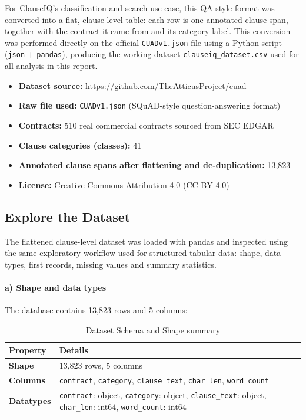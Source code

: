 \documentclass[12pt, a4paper]{report}
\begin{document}
For ClauseIQ's classification and search use case, this QA-style format was converted into a flat, clause-level table: each row is one annotated clause span, together with the contract it came from and its category label. This conversion was performed directly on the official \texttt{CUADv1.json} file using a Python script (\texttt{json} + \texttt{pandas}), producing the working dataset \texttt{clauseiq\_dataset.csv} used for all analysis in this report.
\begin{itemize}
    \item \textbf{Dataset source:} \url{https://github.com/TheAtticusProject/cuad}
    \item \textbf{Raw file used:} \texttt{CUADv1.json} (SQuAD-style question-answering format)
    \item \textbf{Contracts:} 510 real commercial contracts sourced from SEC EDGAR
    \item \textbf{Clause categories (classes):} 41
    \item \textbf{Annotated clause spans after flattening and de-duplication:} 13,823
    \item \textbf{License:} Creative Commons Attribution 4.0 (CC BY 4.0)
\end{itemize}

\subsection{Explore the Dataset}
The flattened clause-level dataset was loaded with pandas and inspected using the same exploratory workflow used for structured tabular data: shape, data types, first records, missing values and summary statistics.

\paragraph{a) Shape and data types}
The database contains 13,823 rows and 5 columns:
\begin{table}[h]
\centering
\small
\begin{tabular}{p{4cm}p{11cm}}
\toprule
\textbf{Property} & \textbf{Details} \\
\midrule
\textbf{Shape} & 13,823 rows, 5 columns \\
\textbf{Columns} & \texttt{contract}, \texttt{category}, \texttt{clause\_text}, \texttt{char\_len}, \texttt{word\_count} \\
\textbf{Datatypes} & \texttt{contract}: object, \texttt{category}: object, \texttt{clause\_text}: object, \texttt{char\_len}: int64, \texttt{word\_count}: int64 \\
\bottomrule
\end{tabular}
\caption{Dataset Schema and Shape summary}
\label{tab:dataset_shape}
\end{table}
\end{document}
